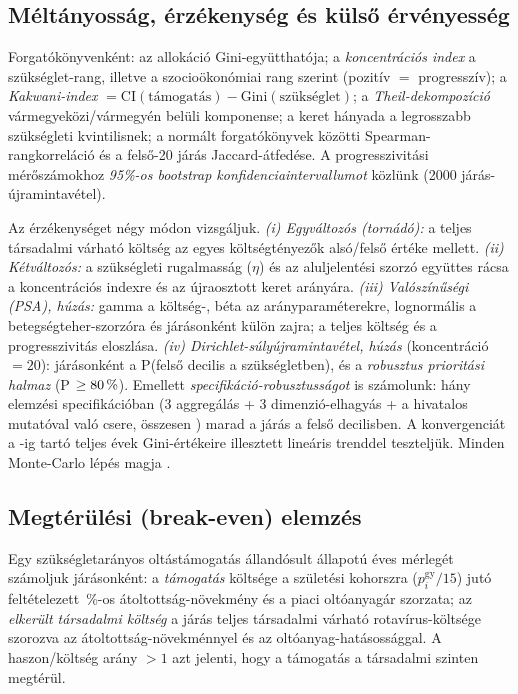 \documentclass[12pt,a4paper]{article}
\begin{document}
\subsection{Méltányosság, érzékenység és külső érvényesség}
Forgatókönyvenként: az allokáció Gini-együtthatója; a \emph{koncentrációs
index} a szükséglet-rang, illetve a szocioökonómiai rang szerint (pozitív $=$
progresszív); a \emph{Kakwani-index} $= \mathrm{CI}(\text{támogatás}) -
\mathrm{Gini}(\text{szükséglet})$; a \emph{Theil-dekompozíció}
vármegyeközi/vármegyén belüli komponense; a keret hányada a legrosszabb
szükségleti kvintilisnek; a normált forgatókönyvek közötti
Spearman-rangkorreláció és a felső-20 járás Jaccard-átfedése. A
progresszivitási mérőszámokhoz \emph{95\%-os bootstrap
konfidenciaintervallumot} közlünk (2000 járás-újramintavétel).

Az érzékenységet négy módon vizsgáljuk. \emph{(i) Egyváltozós (tornádó):} a
teljes társadalmi várható költség az egyes költségtényezők alsó/felső értéke
mellett. \emph{(ii) Kétváltozós:} a szükségleti rugalmasság ($\eta$) és az
aluljelentési szorzó együttes rácsa a koncentrációs indexre és az
újraosztott keret arányára. \emph{(iii) Valószínűségi (PSA), \psaDraws{}
húzás:} gamma a költség-, béta az arányparaméterekre, lognormális a
betegségteher-szorzóra és járásonként külön zajra; a teljes költség és a
progresszivitás eloszlása. \emph{(iv) Dirichlet-súlyújramintavétel, \wDraws{}
húzás} (koncentráció $=20$): járásonként a P(felső decilis a szükségletben),
és a \emph{robusztus prioritási halmaz} (P $\ge 80\,\%$).
Emellett \emph{specifikáció-robusztusságot} is számolunk: hány elemzési
specifikációban (3 aggregálás + 3 dimenzió-elhagyás + a hivatalos mutatóval
való csere, összesen \nSpecs) marad a járás a felső decilisben. A
konvergenciát a \csYear-ig tartó teljes évek Gini-értékeire illesztett
lineáris trenddel teszteljük. Minden Monte-Carlo lépés magja \seed.

\subsection{Megtérülési (break-even) elemzés}
Egy szükségletarányos oltástámogatás állandósult állapotú éves mérlegét
számoljuk járásonként: a \emph{támogatás} költsége a születési kohorszra
($p^{\text{gy}}_i/15$) jutó feltételezett \ceUptakeGain\,\%-os
átoltottság-növekmény és a piaci oltóanyagár szorzata; az \emph{elkerült
társadalmi költség} a járás teljes társadalmi várható rotavírus-költsége
szorozva az átoltottság-növekménnyel és az oltóanyag-hatásossággal. A
haszon/költség arány $>1$ azt jelenti, hogy a támogatás a társadalmi szinten
megtérül.
\end{document}

